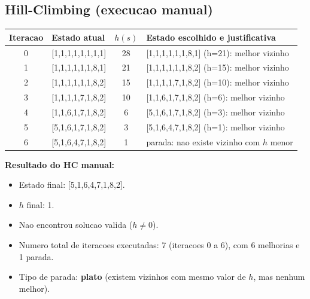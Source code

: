 \subsection{Hill-Climbing (execucao manual)}
\begingroup
\small
\begin{longtable}{c p{3.8cm} c p{7.2cm}}
\toprule
Iteracao & Estado atual & $h(s)$ & Estado escolhido e justificativa \\
\midrule
0 & [1,1,1,1,1,1,1,1] & 28 & [1,1,1,1,1,1,8,1] (h=21): melhor vizinho \\
1 & [1,1,1,1,1,1,8,1] & 21 & [1,1,1,1,1,1,8,2] (h=15): melhor vizinho \\
2 & [1,1,1,1,1,1,8,2] & 15 & [1,1,1,1,7,1,8,2] (h=10): melhor vizinho \\
3 & [1,1,1,1,7,1,8,2] & 10 & [1,1,6,1,7,1,8,2] (h=6): melhor vizinho \\
4 & [1,1,6,1,7,1,8,2] & 6 & [5,1,6,1,7,1,8,2] (h=3): melhor vizinho \\
5 & [5,1,6,1,7,1,8,2] & 3 & [5,1,6,4,7,1,8,2] (h=1): melhor vizinho \\
6 & [5,1,6,4,7,1,8,2] & 1 & parada: nao existe vizinho com $h$ menor \\
\bottomrule
\end{longtable}
\endgroup

\textbf{Resultado do HC manual:}
\begin{itemize}[leftmargin=1.5em]
  \item Estado final: [5,1,6,4,7,1,8,2].
  \item $h$ final: 1.
  \item Nao encontrou solucao valida ($h \neq 0$).
  \item Numero total de iteracoes executadas: 7 (iteracoes 0 a 6), com 6 melhorias e 1 parada.
  \item Tipo de parada: \textbf{plato} (existem vizinhos com mesmo valor de $h$, mas nenhum melhor).
\end{itemize}

